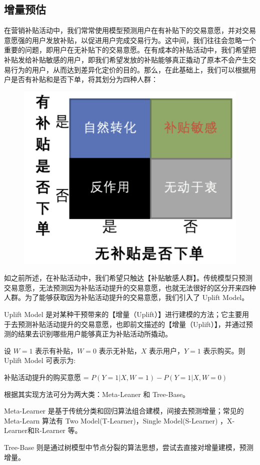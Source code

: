 \documentclass[12pt]{article}
\begin{document}
\subsection{增量预估}
在营销补贴活动中，我们常常使用模型预测用户在有补贴下的交易意愿，并对交易意愿强的用户发放补贴，以促进用户完成交易行为。这中间，我们往往会忽略一个重要的问题，即用户在无补贴下的交易意愿。在有成本的补贴活动中，我们希望把补贴发给补贴敏感的用户，即我们希望发放的补贴能够真正撬动了原本不会产生交易行为的用户，从而达到差异化定价的目的。那么，在此基础上，我们可以根据用户是否有补贴和是否下单，将其划分为四种人群：
\begin{figure}[H]
    \centering
    \includegraphics[width=.6\textwidth]{fig/Causal_Inference_In_DiDi_10.png}
\end{figure}

如之前所述，在补贴活动中，我们希望只触达【补贴敏感人群】。传统模型只预测交易意愿，无法预测因为补贴活动提升的交易意愿，也就无法很好的区分开来四种人群。为了能够获取因为补贴活动提升的交易意愿，我们引入了 Uplift Model。

Uplift Model 是对某种干预带来的【增量（Uplift）】进行建模的方法；它主要用于去预测补贴活动提升的交易意愿，也即前文描述的【增量（Uplift）】，并通过预测的结果去识别哪些用户能够真正为补贴活动所撬动。

设 $W=1$ 表示有补贴，$W=0$ 表示无补贴，$X$ 表示用户，$Y=1$ 表示购买。则 Uplift Model 可表示为:

补贴活动提升的购买意愿 = $P(Y = 1|X,W = 1) − P(Y = 1|X,W = 0)$

根据其实现方法可分为两大类：Meta-Leaner 和 Tree-Base。

Meta-Learner 是基于传统分类和回归算法组合建模，间接去预测增量；常见的 Meta-Learn 算法有 Two Model(T-Learner)，Single Model(S-Learner) ，X-Learner和R-Learner 等。

Tree-Base 则是通过树模型中节点分裂的算法思想，尝试去直接对增量建模，预测增量。
\end{document}
